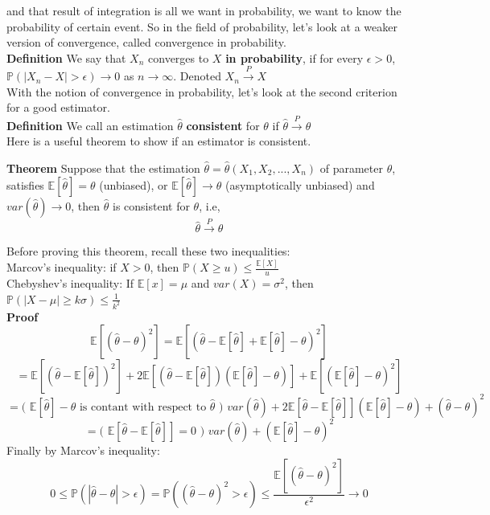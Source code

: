 \documentclass[a4paper,12pt]{article}
\begin{document}
and that result of integration is all we want in probability, we want to know the probability of certain event. So in the field of probability, let's look at a weaker version of convergence, called convergence in probability.\\

\textbf{Definition} We say that $X_n$ converges to $X$ \textbf{in probability}, if for every $\epsilon > 0$, $\mathbb{P}(|X_n-X|>\epsilon) \to 0$ as $n \to \infty$. Denoted $X_n \overset{P}{\to} X$\\

With the notion of convergence in probability, let's look at the second criterion for a good estimator.\\

\textbf{Definition}  We call an estimation $\hat{\theta}$ \textbf{consistent} for $\theta$ if $\hat{\theta} \overset{P}{\to} \theta$\\

Here is a useful theorem to show if an estimator is consistent.

\textbf{Theorem} Suppose that the estimation $\hat{\theta} = \hat{\theta}(X_1, X_2, ..., X_n)$ of parameter $\theta$, satisfies $\mathbb{E}[\hat{\theta}] = \theta$ (unbiased), or $\mathbb{E}[\hat{\theta}] \to \theta$  (asymptotically unbiased) and
$var( \hat{\theta} ) \to 0$, then $\hat{\theta}$ is consistent for $\theta$, i.e,
$$\hat{\theta} \overset{P}{\to} \theta$$

Before proving this theorem, recall these two inequalities:\\
Marcov's inequality: if $X > 0$, then $\mathbb{P}(X\geq u) \leq \frac{\mathbb{E}[X]}{u}$\\
Chebyshev's inequality: If $\mathbb{E}[x] = \mu$ and $var(X) = \sigma^2$, then $\mathbb{P}(|X-\mu| \geq k\sigma) \leq \frac{1}{k^2}$\\

\textbf{Proof} $$\mathbb{E}[(\hat{\theta} - \theta)^2] = \mathbb{E}[(\hat{\theta} - \mathbb{E}[\hat{\theta}] + \mathbb{E}[\hat{\theta}] - \theta)^2]$$
$$= \mathbb{E}[(\hat{\theta} - \mathbb{E}[\hat{\theta}])^2] + 2\mathbb{E}[ (\hat{\theta} - \mathbb{E}[\hat{\theta}])(\mathbb{E}[\hat{\theta}] - \theta) ] + \mathbb{E}[(\mathbb{E}[\hat{\theta}] - \theta)^2]$$
$$=  \text{( } \mathbb{E}[\hat{\theta}] - \theta \text{ is contant with respect to } \hat{\theta} \text{ ) } var(\hat{\theta}) + 2\mathbb{E}[ \hat{\theta} - \mathbb{E}[\hat{\theta}]](\mathbb{E}[\hat{\theta}] - \theta) + (\hat{\theta} - \theta)^2$$
$$= \text{( } \mathbb{E}[ \hat{\theta} - \mathbb{E}[\hat{\theta}]] = 0 \text{ ) }var(\hat{\theta}) + (\mathbb{E}[\hat{\theta}] - \theta)^2$$
Finally by Marcov's inequality:
$$0 \leq \mathbb{P}( | \hat{\theta} - \theta | > \epsilon ) = \mathbb{P}( ( \hat{\theta} - \theta )^2 > \epsilon ) \leq \frac{\mathbb{E}[ ( \hat{\theta} - \theta )^2 ]}{\epsilon^2} \to 0$$
\end{document}
